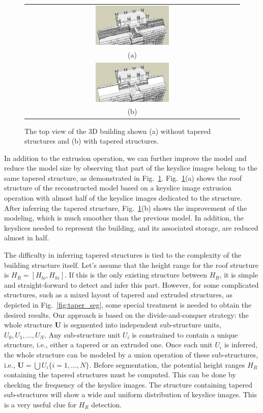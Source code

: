 \documentclass[review]{acmsiggraph}       %
\newcommand{\Fig}[1]{Fig.~\ref{fig:#1}}
\newcommand{\Figa}[1]{Fig.~\ref{fig:#1}(a)}
\newcommand{\Figb}[1]{Fig.~\ref{fig:#1}(b)}
\begin{document}
\begin{figure}[htbp]
\begin{center}
\begin{tabular}{c}
\includegraphics[width=0.35\textwidth]{extrude_1.png} \\
(a) \\
\includegraphics[width=0.35\textwidth]{extrude_2.png} \\
(b)
\end{tabular}
\end{center}
\caption{The top view of the 3D building shown (a) without tapered structures
and (b) with tapered structures.}
\label{fig:DXF_top}
\end{figure}

In addition to the extrusion operation, we can further improve the model
and reduce the model size by observing that part of the keyslice images
belong to the same tapered structure, as demonstrated in \Fig{DXF_top}.
\Figa{DXF_top} shows the roof structure
of the reconstructed model based on a keyslice image extrusion operation with
almost half of the keyslice images dedicated to the structure.
After inferring the tapered structure, \Figb{DXF_top} shows the improvement
of the modeling, which is much smoother than the previous model.
In addition, the keyslices needed to represent the building, and its
associated storage, are reduced almost in half.

The difficulty in inferring tapered structures is tied to the complexity of
the building structure itself.
Let's assume that the height range for the roof structure is
$H_R = [H_{lo}, H_{hi}]$.
If this is the only existing structure between $H_R$, it is simple and
straight-forward to detect and infer this part.
However, for some complicated structures, such as a mixed layout
of tapered and extruded structures, as depicted in \Fig{taper_seg},
some special treatment is needed to obtain the desired results.
Our approach is based on the divide-and-conquer strategy:
the whole structure $\boldsymbol{U}$ is segmented into independent
sub-structure units, $U_0, U_1, \ldots, U_N$.
Any sub-structure unit $U_i$ is constrained to contain a unique structure,
i.e., either a tapered or an extruded one.
Once each unit $U_i$ is inferred, the whole structure can be modeled by a
union operation of these sub-structures, i.e.,
$\boldsymbol{U} = \bigcup{U_i\{ i = 1,\ldots,N\}}$.
Before segmentation, the potential height ranges $H_R$ containing the tapered
structures must be computed.
This can be done by checking the frequency of the keyslice images.
The structure containing tapered sub-structures will show a wide and uniform
distribution of keyslice images.
This is a very useful clue for $H_R$ detection.
\end{document}
